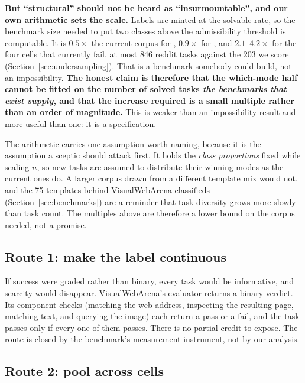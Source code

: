 \begin{scopebox}
\textbf{But ``structural'' should not be heard as ``insurmountable'', and our own
arithmetic sets the scale.} Labels are minted at the solvable rate, so the
benchmark size needed to put two classes above the admissibility threshold is
computable. It is $0.5\times$ the current corpus for ,
$0.9\times$ for , and $2.1$--$4.2\times$ for the four cells that currently fail, at most 846 reddit tasks against the 203 we score
(Section~\ref{sec:undersampling}). That is a benchmark somebody could build, not
an impossibility. \textbf{The honest claim is therefore that the which-mode
half cannot be fitted on the number of solved tasks \emph{the benchmarks that
exist supply}, and that the increase required is a small multiple rather than
an order of magnitude.} This is
weaker than an impossibility result and more useful than one: it is a
specification.

The arithmetic carries one assumption worth naming, because it is the assumption
a sceptic should attack first. It holds the \emph{class proportions} fixed while scaling $n$, so new tasks are assumed to distribute their winning modes as the
current ones do. A larger corpus drawn from a different template mix would not,
and the 75 templates behind VisualWebArena classifieds
(Section~\ref{sec:benchmarks}) are a reminder that task diversity grows more
slowly than task count. The multiples above are therefore a lower bound on the
corpus needed, not a promise.
\end{scopebox}

\subsection{Route 1: make the label continuous}

If success were graded rather than binary, every task would be informative, and scarcity would disappear. VisualWebArena's evaluator returns a binary verdict.
Its component checks (matching the web address, inspecting the resulting
page, matching text, and querying the image) each return a pass or a fail,
and the task passes only if every one of them passes. There is no partial
credit to expose. The route is closed by the benchmark's
measurement instrument, not by our analysis.

\subsection{Route 2: pool across cells}

